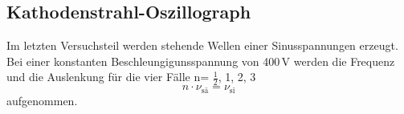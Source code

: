 \subsection{Kathodenstrahl-Oszillograph}
Im letzten Versuchsteil werden stehende Wellen einer Sinusspannungen erzeugt. Bei einer konstanten Beschleungigunsspannung von 400\,V
werden die Frequenz und die Auslenkung für die vier Fälle n= $\frac{1}{2}$, 1, 2, 3
\begin{equation}
n \cdot \nu_\text{sä} = \nu_\text{si}
\end{equation}
aufgenommen.
